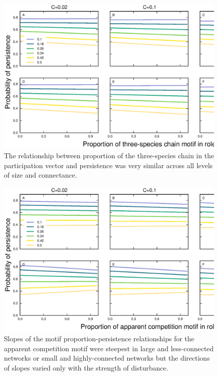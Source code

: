 \documentclass[12pt]{article}
\begin{document}
\begin{spacing}{2.0}
    \begin{figure}[hb!]
        \centering
        \includegraphics[width=\textwidth]{figures/persistence_chain_detailpers.eps}
        \caption{The relationship between proportion of the three-species chain in the participation vector and persistence was very similar across all levels of size and connectance.}
        \label{chain_plus_SC}
        \end{figure}

    \begin{figure}[hb!]
        \centering
        \includegraphics[width=\textwidth]{figures/persistence_apparent_detailpers.eps}
        \caption{Slopes of the motif proportion-persistence relationships for the apparent competition motif were steepest in large and less-connected networks or small and highly-connected networks but the directions of slopes varied only with the strength of disturbance.}
        \label{apparent_plus_SC}
        \end{figure}


\end{spacing}
\end{document}

